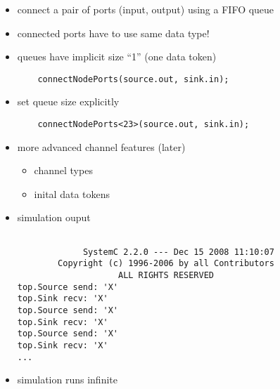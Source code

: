 \begin{frame}[fragile=singleslide]
\begin{itemize}
\item connect a pair of ports (input, output) using a FIFO queue
\item connected ports have to use same data type!
\item queues have implicit size ``1'' (one data token)
\begin{lstlisting}
    connectNodePorts(source.out, sink.in);
\end{lstlisting}
\item set queue size explicitly
\begin{lstlisting}
    connectNodePorts<23>(source.out, sink.in);
\end{lstlisting}
\item more advanced channel features (later)
\begin{itemize}
\item channel types
\item inital data tokens
\end{itemize}
\end{itemize}
\end{frame}




\begin{frame}[fragile=singleslide]
\begin{itemize}
\item simulation ouput
\begin{lstlisting}

             SystemC 2.2.0 --- Dec 15 2008 11:10:07
        Copyright (c) 1996-2006 by all Contributors
                    ALL RIGHTS RESERVED
top.Source send: 'X'
top.Sink recv: 'X'
top.Source send: 'X'
top.Sink recv: 'X'
top.Source send: 'X'
top.Sink recv: 'X'
...
\end{lstlisting}
\item simulation runs infinite
\end{itemize}
\end{frame}





